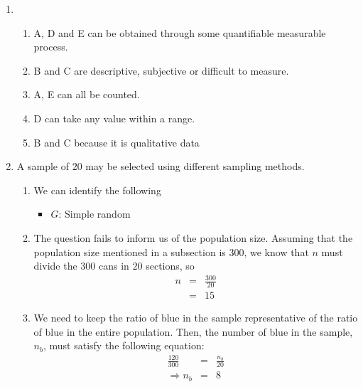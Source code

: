	\begin{enumerate}[label = \bfseries (\alph*)]
		\item
		\begin{enumerate}[label = \bfseries (\roman*)]
			\item  A, D and E can be obtained through some quantifiable measurable process.

			\item B and C are descriptive, subjective or difficult to measure.

			\item A, E can all be counted.

			\item  D can take any value within a range.

			\item B and C because it is qualitative data


		\end{enumerate}

		\item A sample of $20$ may be selected using different sampling methods.

		\begin{enumerate}[label = \bfseries (\roman*)]
			\item We can identify the following
			\begin{itemize}
				\item $G$: Simple random
			\end{itemize}

			\item The question fails to inform us of the population size. Assuming that the population size mentioned in a subsection is $300$, we know that $n$ must divide the $300$ cans in $20$ sections, so
			\begin{eqnarray}
			n &=& \frac{300}{20}\\
			&=& 15\
			\end{eqnarray}

			\item We need to keep the ratio of blue in the sample representative of the ratio of blue in the entire population. Then, the number of blue in the sample, $n_b$, must satisfy the following equation:
			\begin{eqnarray}
				\frac{120}{300}&=& \frac{n_b}{20} \\
				\Rightarrow n_b &=& 8 \
			\end{eqnarray}


\end{enumerate}
\end{enumerate}
